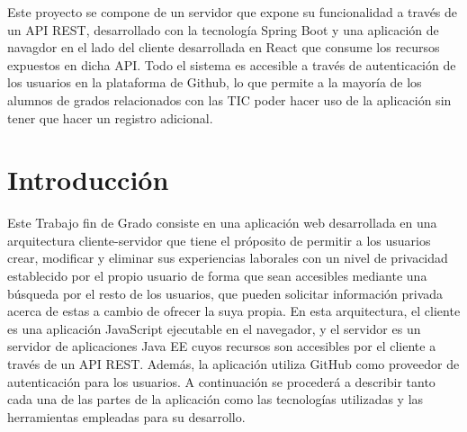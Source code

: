 \documentclass[a4paper, 12pt]{book}
\begin{document}
    Este proyecto se compone de un servidor que expone su funcionalidad a través de un API REST, desarrollado con la tecnología Spring Boot y una aplicación de navagdor en el lado del cliente desarrollada en React que consume los recursos expuestos en dicha API.
    Todo el sistema es accesible a través de autenticación de los usuarios en la plataforma de Github, lo que permite a la mayoría de los alumnos de grados relacionados con las TIC poder hacer uso de la aplicación sin tener que hacer un registro adicional.


    \tableofcontents
    \cleardoublepage
    \listoffigures %



    \cleardoublepage


    \chapter{Introducción}
    \label{sec:intro} %

    Este Trabajo fin de Grado consiste en una aplicación web desarrollada en una arquitectura cliente-servidor que tiene el próposito de permitir a los usuarios crear, modificar y eliminar sus experiencias laborales con un nivel de privacidad establecido por el propio usuario
    de forma que sean accesibles mediante una búsqueda por el resto de los usuarios, que pueden solicitar información privada acerca de estas a cambio de ofrecer la suya propia.
    En esta arquitectura, el cliente es una aplicación JavaScript ejecutable en el navegador,
    y el servidor es un servidor de aplicaciones Java EE cuyos recursos son accesibles por el cliente a través de un API REST. Además, la aplicación utiliza GitHub como proveedor de autenticación para los usuarios.
    A continuación se procederá a describir tanto cada una de las partes de la aplicación como las tecnologías utilizadas y las herramientas empleadas para su desarrollo.
\end{document}
